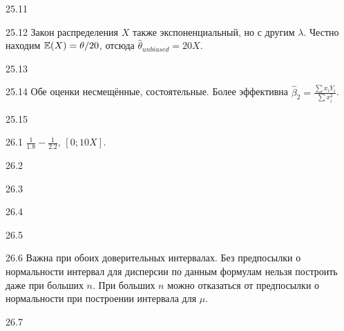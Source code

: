 \protect \hypertarget {soln:25.11}{}
\begin{solution}{{25.11}}

\end{solution}
\protect \hypertarget {soln:25.12}{}
\begin{solution}{{25.12}}
  Закон распределения $X$ также экспоненциальный, но с другим $\lambda$. Честно находим $\mathbb{E}(X)=\theta/20$, отсюда
  $\hat\theta_{unbiased} = 20X$.
\end{solution}
\protect \hypertarget {soln:25.13}{}
\begin{solution}{{25.13}}

\end{solution}
\protect \hypertarget {soln:25.14}{}
\begin{solution}{{25.14}}
Обе оценки несмещённые, состоятельные. Более эффективна $\hat{\beta}_{2}=\frac{\sum{x_{i}Y_{i}}}{\sum x_{i}^{2}}$.
\end{solution}
\protect \hypertarget {soln:25.15}{}
\begin{solution}{{25.15}}

\end{solution}
\protect \hypertarget {soln:26.1}{}
\begin{solution}{{26.1}}
  $\frac{1}{1.8} - \frac{1}{2.2}$, $[0;10X]$.
\end{solution}
\protect \hypertarget {soln:26.2}{}
\begin{solution}{{26.2}}
\end{solution}
\protect \hypertarget {soln:26.3}{}
\begin{solution}{{26.3}}
\end{solution}
\protect \hypertarget {soln:26.4}{}
\begin{solution}{{26.4}}
\end{solution}
\protect \hypertarget {soln:26.5}{}
\begin{solution}{{26.5}}
\end{solution}
\protect \hypertarget {soln:26.6}{}
\begin{solution}{{26.6}}
Важна при обоих доверительных интервалах. Без предпосылки о нормальности интервал для дисперсии по данным формулам нельзя построить даже при больших $n$. При больших $n$ можно отказаться от предпосылки о нормальности при построении интервала для $\mu$.
\end{solution}
\protect \hypertarget {soln:26.7}{}
\begin{solution}{{26.7}}
\end{solution}
\protect \hypertarget {soln:27.1}{}
